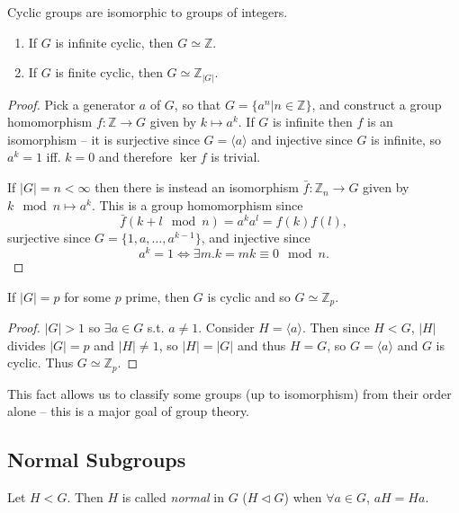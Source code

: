 \begin{prop}
Cyclic groups are isomorphic to groups of integers.
\begin{enumerate}
  \item{If $G$ is infinite cyclic, then $G \simeq \mathbb{Z}$.}
  \item{If $G$ is finite cyclic, then $G \simeq \mathbb{Z}_{|G|}$.}
\end{enumerate}
\end{prop}
\begin{proof}
Pick a generator $a$ of $G$, so that
$G = \{ a^n | n \in \mathbb{Z} \}$, and construct a group homomorphism
$f : \mathbb{Z} \to G$ given by $k \mapsto a^k$. If $G$ is
infinite then $f$ is an isomorphism -- it is surjective since
$G = \langle a \rangle$ and injective since $G$ is infinite, so $a^k =
1$ iff. $k = 0$ and therefore $\ker f$ is trivial.

If $|G| = n < \infty$ then
there is instead an isomorphism $\bar{f} : \mathbb{Z}_n \to G$ given by
$k \mod n \mapsto a^k$. This is a group homomorphism since
$$
\bar{f}(k + l \mod n) = a^{k}a^{l} = f(k)f(l),
$$
surjective since $G = \{ 1, a, \dots, a^{k-1}\}$, and injective since
$$a^k = 1 \iff \exists m . k = mk \equiv 0 \mod n.$$
\end{proof}

\begin{prop}
If $|G| = p$ for some $p$ prime, then $G$ is cyclic and so
$G \simeq \mathbb{Z}_p$.
\end{prop}
\begin{proof}
$|G| > 1$ so $\exists a \in G$ s.t. $a \neq 1$. Consider
$H = \langle a \rangle$. Then since $H < G$,
$|H|$ divides $|G| = p$ and
$|H| \neq 1$, so $|H| = |G|$ and thus $H = G$, so
$G = \langle a \rangle$ and $G$ is cyclic. Thus $G \simeq \mathbb{Z}_p$.
\end{proof}

This fact allows us to classify some groups (up to isomorphism) from
their order alone -- this is a major goal of group theory.

\subsection{Normal Subgroups}

\begin{defn}
Let $H < G$. Then $H$ is called \emph{normal} in $G$
($H \triangleleft G$) when $\forall a \in G$, $aH = Ha$.
\end{defn}

